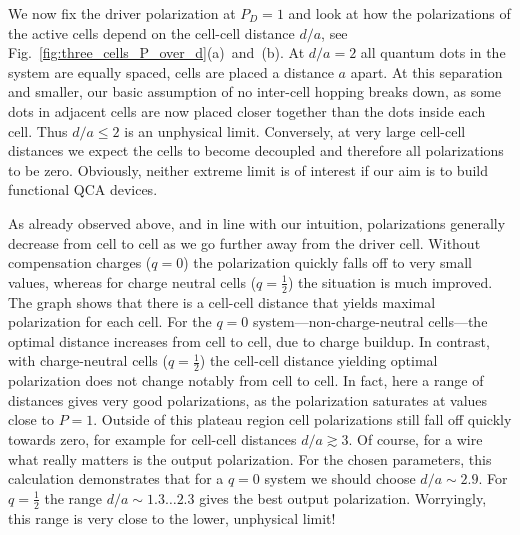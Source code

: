 %
We now fix the driver polarization at $P_D = 1$ and look at how the
polarizations of the active cells depend on the cell-cell distance $d/a$, see
Fig.~\ref{fig:three_cells_P_over_d}(a)~and~(b). At $d/a = 2$ all quantum dots in
the system are equally spaced, cells are placed a distance $a$ apart. At this
separation and smaller, our basic assumption of no inter-cell hopping breaks
down, as some dots in adjacent cells are now placed closer together than the
dots inside each cell. Thus $d/a \le 2$ is an unphysical limit. Conversely, at
very large cell-cell distances we expect the cells to become decoupled and
therefore all polarizations to be zero. Obviously, neither extreme limit is of
interest if our aim is to build functional QCA devices.

As already observed above, and in line with our intuition, polarizations
generally decrease from cell to cell as we go further away from the driver cell.
Without compensation charges ($q=0$) the polarization quickly falls off to very
small values, whereas for charge neutral cells ($q = \frac{1}{2}$) the situation
is much improved. The graph shows that there is a cell-cell distance that yields
maximal polarization for each cell. For the $q=0$ system---non-charge-neutral
cells---the optimal distance increases from cell to cell, due to charge buildup.
In contrast, with charge-neutral cells ($q=\frac{1}{2}$) the cell-cell distance
yielding optimal polarization does not change notably from cell to cell. In
fact, here a range of distances gives very good polarizations, as the
polarization saturates at values close to $P = 1$. Outside of this plateau
region cell polarizations still fall off quickly towards zero, for example for
cell-cell distances $d/a \gtrsim 3$. Of course, for a wire what really matters
is the output polarization. For the chosen parameters, this calculation
demonstrates that for a $q=0$ system we should choose $d/a \sim 2.9$. For
$q=\frac{1}{2}$ the range $d/a \sim 1.3 \ldots 2.3$ gives the best output
polarization. Worryingly, this range is very close to the lower, unphysical
limit!

